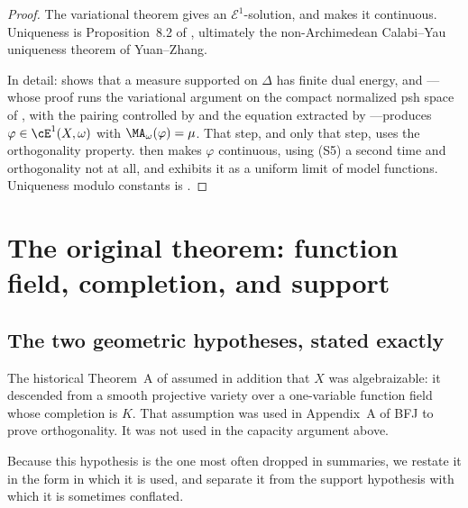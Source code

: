 \begin{proof}
The variational theorem gives an $\mathcal E^1$-solution, and
 makes it continuous.  Uniqueness
is Proposition~8.2 of \cite{BFJ15}, ultimately the non-Archimedean
Calabi--Yau uniqueness theorem of Yuan--Zhang.

In detail:  shows that a measure
supported on $\Delta$ has finite dual energy, and
---whose proof runs the variational argument on
the compact normalized psh space of
, with the pairing controlled by
 and the equation extracted by
---produces
$\varphi\in\cE^1(X,\omega)$ with $\MA_\omega(\varphi)=\mu$.  That step,
and only that step, uses the orthogonality property.
 then makes $\varphi$ continuous,
using \textup{(S5)} a second time and orthogonality not at all, and
 exhibits it as a uniform limit of model
functions.  Uniqueness modulo constants is .
\end{proof}

\section{The original theorem: function field, completion, and support}
\label{sec:ch29-original}

\subsection{The two geometric hypotheses, stated exactly}
\label{sec:ch29-two-geometric}

The historical Theorem~A of \cite{BFJ15} assumed in addition that $X$ was
algebraizable: it descended from a smooth projective variety over a
one-variable function field whose completion is $K$.  That assumption was
used in Appendix~A of BFJ to prove orthogonality.  It was not used in the
capacity argument above.

Because this hypothesis is the one most often dropped in summaries, we
restate it in the form in which it is used, and separate it from the support
hypothesis with which it is sometimes conflated.

